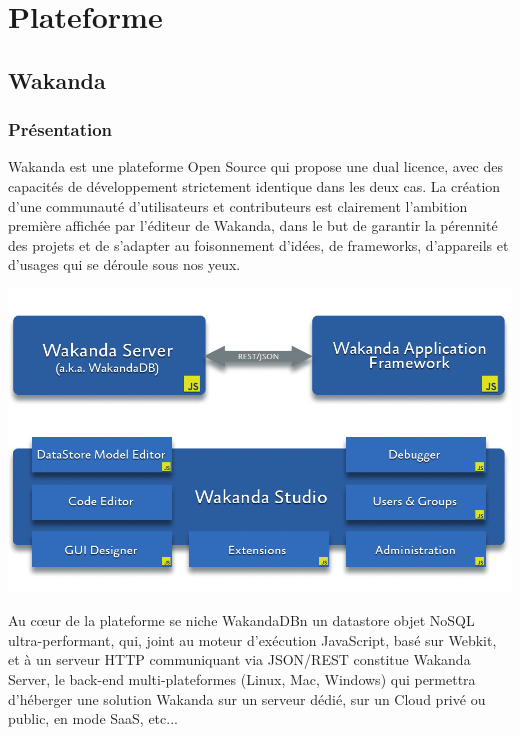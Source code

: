 \chapter{Plateforme}

\section{Wakanda}
\label{ch:wakanda}

\subsection{Présentation}

Wakanda est une plateforme Open Source qui propose une dual licence, avec des capacités de développement strictement identique dans les deux cas. La création d'une communauté d’utilisateurs et contributeurs est clairement l’ambition première affichée par l’éditeur de Wakanda, dans le but de garantir la pérennité des projets et de s’adapter au foisonnement d’idées, de frameworks, d’appareils et d’usages qui se déroule sous nos yeux.


 
\begin{center}
\includegraphics[scale=0.4]{img/wakanda.png}
\label{Plateforme Wakanda}
\end{center}




Au cœur de la plateforme se niche WakandaDBn un datastore objet NoSQL ultra-performant, qui, joint au moteur d’exécution JavaScript, basé sur Webkit, et à un serveur HTTP communiquant via JSON/REST constitue Wakanda Server, le back-end multi-plateformes (Linux, Mac, Windows) qui permettra d’héberger une solution Wakanda sur un serveur dédié, sur un Cloud privé ou public, en mode SaaS, etc...

